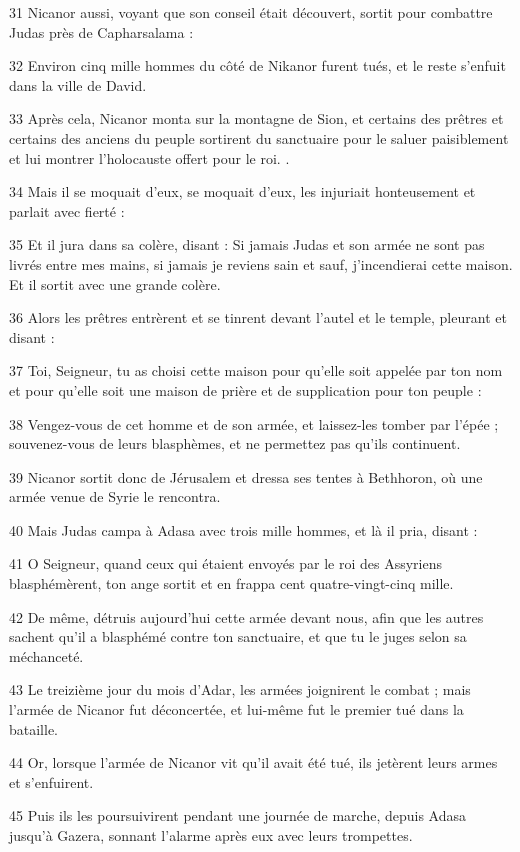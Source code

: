 \par 31 Nicanor aussi, voyant que son conseil était découvert, sortit pour combattre Judas près de Capharsalama :
\par 32 Environ cinq mille hommes du côté de Nikanor furent tués, et le reste s'enfuit dans la ville de David.
\par 33 Après cela, Nicanor monta sur la montagne de Sion, et certains des prêtres et certains des anciens du peuple sortirent du sanctuaire pour le saluer paisiblement et lui montrer l'holocauste offert pour le roi. .
\par 34 Mais il se moquait d'eux, se moquait d'eux, les injuriait honteusement et parlait avec fierté :
\par 35 Et il jura dans sa colère, disant : Si jamais Judas et son armée ne sont pas livrés entre mes mains, si jamais je reviens sain et sauf, j'incendierai cette maison. Et il sortit avec une grande colère.
\par 36 Alors les prêtres entrèrent et se tinrent devant l'autel et le temple, pleurant et disant :
\par 37 Toi, Seigneur, tu as choisi cette maison pour qu'elle soit appelée par ton nom et pour qu'elle soit une maison de prière et de supplication pour ton peuple :
\par 38 Vengez-vous de cet homme et de son armée, et laissez-les tomber par l'épée ; souvenez-vous de leurs blasphèmes, et ne permettez pas qu'ils continuent.
\par 39 Nicanor sortit donc de Jérusalem et dressa ses tentes à Bethhoron, où une armée venue de Syrie le rencontra.
\par 40 Mais Judas campa à Adasa avec trois mille hommes, et là il pria, disant :
\par 41 O Seigneur, quand ceux qui étaient envoyés par le roi des Assyriens blasphémèrent, ton ange sortit et en frappa cent quatre-vingt-cinq mille.
\par 42 De même, détruis aujourd'hui cette armée devant nous, afin que les autres sachent qu'il a blasphémé contre ton sanctuaire, et que tu le juges selon sa méchanceté.
\par 43 Le treizième jour du mois d'Adar, les armées joignirent le combat ; mais l'armée de Nicanor fut déconcertée, et lui-même fut le premier tué dans la bataille.
\par 44 Or, lorsque l'armée de Nicanor vit qu'il avait été tué, ils jetèrent leurs armes et s'enfuirent.
\par 45 Puis ils les poursuivirent pendant une journée de marche, depuis Adasa jusqu'à Gazera, sonnant l'alarme après eux avec leurs trompettes.

